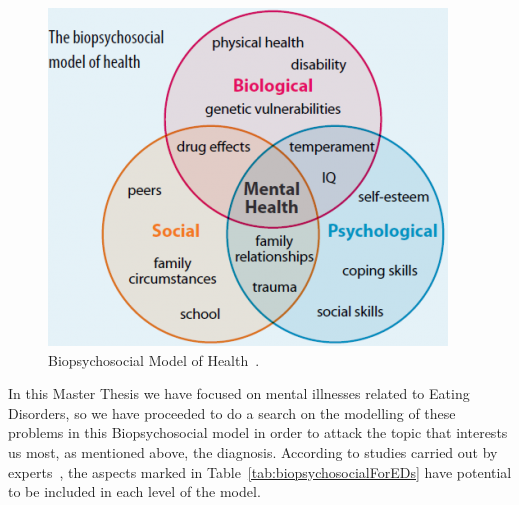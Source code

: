 \begin{figure}[!htp]
    \centering
    \includegraphics[scale=0.65]{img/state-of-art/biopsychosocial model.png}
    \caption{Biopsychosocial Model of Health~\cite{Biopsych52:online}.}
    \label{fig:biopsychosocial}
\end{figure}


In this Master Thesis we have focused on mental illnesses related to Eating Disorders, so we have proceeded to do a search on the modelling of these problems in this Biopsychosocial model in order to attack the topic that interests us most, as mentioned above, the diagnosis. According to studies carried out by experts~\cite{WhatCaus58:online}, the aspects marked in Table~\ref{tab:biopsychosocialForEDs} have potential to be included in each level of the model.

